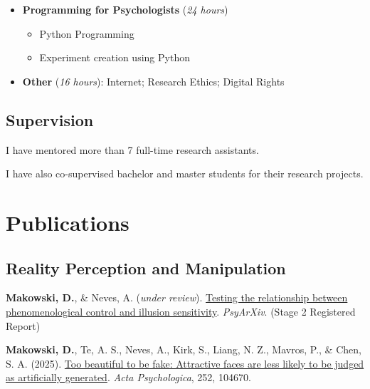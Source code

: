 \documentclass[11pt,a4paper,]{awesome-cv}
\providecommand{\tightlist}{%
	\setlength{\itemsep}{0pt}\setlength{\parskip}{0pt}}
\begin{document}
\begin{itemize}
  \begin{itemize}
  \tightlist
  \item
    Working memory
  \item
    Mental imagery and categorisation
  \end{itemize}
\item
  \textbf{Programming for Psychologists} (\emph{24 hours})

  \begin{itemize}
  \tightlist
  \item
    Python Programming
  \item
    Experiment creation using Python
  \end{itemize}
\item
  \textbf{Other} (\emph{16 hours}): Internet; Research Ethics; Digital
  Rights
\end{itemize}

\normalsize

\subsection{Supervision}\label{supervision}

I have mentored more than 7 full-time research assistants.

I have also co-supervised bachelor and master students for their
research projects.

\section{Publications}\label{publications}

\subsection{Reality Perception and
Manipulation}\label{reality-perception-and-manipulation}

\scriptsize

\textbf{Makowski, D.}, \& Neves, A. (\emph{under review}).
\href{https://osf.io/placeholder}{Testing the relationship between
phenomenological control and illusion sensitivity}. \emph{PsyArXiv}.
(Stage 2 Registered Report)

\textbf{Makowski, D.}, Te, A. S., Neves, A., Kirk, S., Liang, N. Z.,
Mavros, P., \& Chen, S. A. (2025).
\href{https://doi.org/10.1016/j.actpsy.2024.104670}{Too beautiful to be
fake: Attractive faces are less likely to be judged as artificially
generated}. \emph{Acta Psychologica}, 252, 104670.
\end{document}
